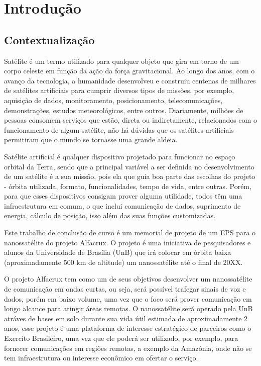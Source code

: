 \chapter{Introdução} \label{introducao}
\section{Contextualização}
Satélite é um termo utilizado para qualquer objeto que gira em torno de um corpo celeste em função da ação da força gravitacional. Ao longo dos anos, com o avanço da tecnologia, a humanidade desenvolveu e construiu centenas de milhares de satélites artificiais para cumprir diversos tipos de missões, por exemplo, aquisição de dados, monitoramento, posicionamento, telecomunicações, demonstrações, estudos meteorológicos, entre outros. Diariamente, milhões de pessoas consomem serviços que estão, direta ou indiretamente, relacionados com o funcionamento de algum satélite, não há dúvidas que os satélites artificiais permitiram que o mundo se tornasse uma grande aldeia.

Satélite artificial é qualquer dispositivo projetado para funcionar no espaço orbital da Terra, sendo que a principal variável a ser definida no desenvolvimento de um satélite é a sua missão, pois ela que guia boa parte das escolhas do projeto - órbita utilizada, formato, funcionalidades, tempo de vida, entre outras. Porém, para que esses dispositivos consigam prover alguma utilidade, todos têm uma infraestrutura em comum, o que inclui comunicação de dados, suprimento de energia, cálculo de posição, isso além das suas funções customizadas.\cite{nasa_comms_article} 

Este trabalho de conclusão de curso é um memorial de projeto de um EPS para o nanossatélite do projeto Alfacrux. O projeto é uma iniciativa de pesquisadores e alunos da Universidade de Brasília (UnB) que irá colocar em órbita baixa (aproximadamente 500 km de altitude) um nanossatélite até o final de 20XX.

O projeto Alfacrux tem como um de seus objetivos desenvolver um nanossatélite de comunicação em ondas curtas, ou seja, será possível trafegar sinais de voz e dados, porém em baixo volume, uma vez que o foco será prover comunicação em longo alcance para atingir áreas remotas. O nanossatélite será operado pela UnB atráves de bases em solo durante sua vida útil estimada de aproximadamente 2 anos, esse projeto é uma plataforma de interesse estratégico de parceiros como o Exercíto Brasileiro, uma vez que ele poderá ser utilizado, por exemplo, para fornecer comunicações em regiões remotas, a exemplo da Amazônia, onde não se tem infraestrutura ou interesse econômico em ofertar o serviço. 

